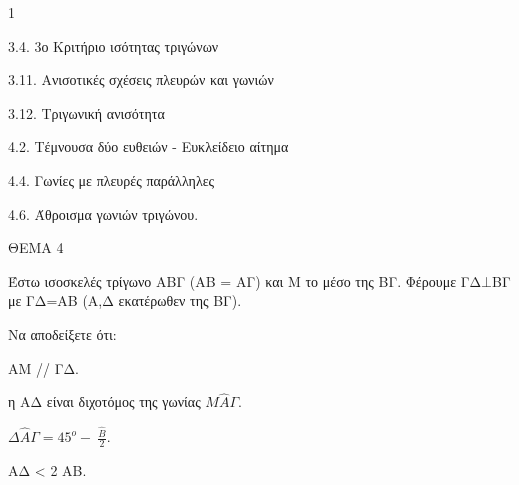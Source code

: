 \begin{ylh}{1}
    \item 3.4. 3ο Κριτήριο ισότητας τριγώνων
    \item 3.11. Ανισοτικές σχέσεις πλευρών και γωνιών
    \item 3.12. Τριγωνική ανισότητα
    \item 4.2. Τέμνουσα δύο ευθειών - Ευκλείδειο αίτημα
    \item 4.4. Γωνίες με πλευρές παράλληλες
    \item 4.6. Άθροισμα γωνιών τριγώνου.
\end{ylh}

ΘΕΜΑ 4

Έστω ισοσκελές τρίγωνο ΑΒΓ (ΑΒ = ΑΓ) και Μ το μέσο της ΒΓ. Φέρουμε ΓΔ$\bot$ΒΓ με ΓΔ=ΑΒ (Α,Δ εκατέρωθεν της ΒΓ).

Nα αποδείξετε ότι:

\begin{alist}
\item ΑΜ // ΓΔ. 

\item η ΑΔ είναι διχοτόμος της γωνίας $Μ\widehat{Α}\Gamma$. 

\item $\Delta\widehat{Α}\Gamma = 45^{ο} - \ \frac{\widehat{Β}}{2}$. 

\item ΑΔ \textless{} 2 ΑΒ. 


\end{alist}
